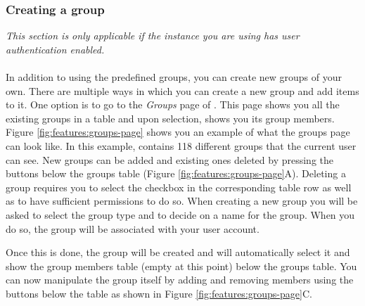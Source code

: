 \subsubsection{Creating a group}
\textit{This section is only applicable if the {\germinate} instance you are using has user authentication enabled.}\\
\\
In addition to using the predefined groups, you can create new groups of your own. There are multiple ways in which you can create a new group and add items to it. One option is to go to the \textit{Groups} page of {\germinate}. This page shows you all the existing groups in a table and upon selection, shows you its group members. Figure \ref{fig:features:groups-page} shows you an example of what the groups page can look like. In this example, {\germinate} contains 118 different groups that the current user can see. New groups can be added and existing ones deleted by pressing the buttons below the groups table (Figure \ref{fig:features:groups-page}A). Deleting a group requires you to select the checkbox in the corresponding table row as well as to have sufficient permissions to do so. When creating a new group you will be asked to select the group type and to decide on a name for the group. When you do so, the group will be associated with your user account.

Once this is done, the group will be created and {\germinate} will automatically select it and show the group members table (empty at this point) below the groups table. You can now manipulate the group itself by adding and removing members using the buttons below the table as shown in Figure \ref{fig:features:groups-page}C.

